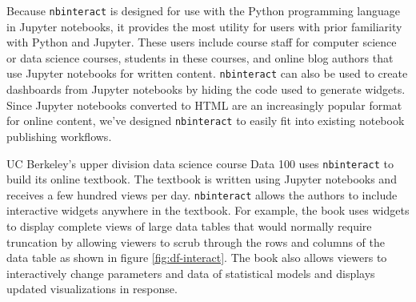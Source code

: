 \documentclass[nobib]{tufte-handout}
\newcommand{\code}[1]{\texttt{#1}}
\begin{document}
Because \code{nbinteract} is designed for use with the Python programming
language in Jupyter notebooks, it provides the most utility for users with
prior familiarity with Python and Jupyter. These users include course staff for
computer science or data science courses, students in these courses, and online
blog authors that use Jupyter notebooks for written content. \code{nbinteract}
can also be used to create dashboards from Jupyter notebooks by hiding the
code used to generate widgets. Since Jupyter notebooks converted to HTML are an
increasingly popular format for online content, we've designed \code{nbinteract}
to easily fit into existing notebook publishing workflows.

UC Berkeley's upper division data science course Data 100 uses
\code{nbinteract} to build its online textbook. The textbook is written using Jupyter
notebooks and receives a few hundred views per day. \code{nbinteract} allows
the authors to include interactive widgets anywhere in the textbook. For
example, the book uses widgets to display complete views of large data tables
that would normally require truncation by allowing viewers to scrub through the
rows and columns of the data table as shown in figure \ref{fig:df-interact}.
The book also allows viewers to interactively change parameters and data of
statistical models and displays updated visualizations in response.
\end{document}
